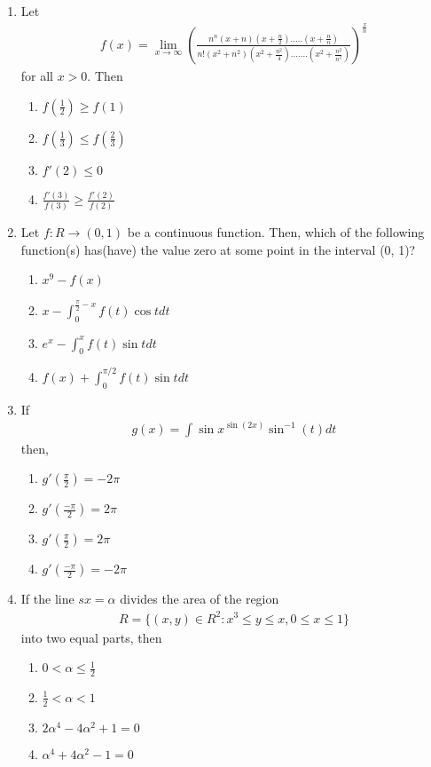 \begin{enumerate}[label=\arabic*.,ref=\thesubsection.\theenumi]
\item Let
\begin{align*}
f(x) = \lim_{x \to \infty}(\frac{n^n(x+n)(x+\frac{n}{2}).....(x+\frac{n}{n})}{n!(x^2+n^2)(x^2+\frac{n^2}{4}).......(x^2+\frac{n^2}{n^2})})^{\frac{x}{n}} 
\end{align*}
for all $x > 0$. Then
\begin{enumerate}
\item $f(\frac{1}{2}) \geq f(1)$
\item $f(\frac{1}{3}) \leq f(\frac{2}{3})$
\item $f'(2) \leq 0$
\item $\frac{f'(3)}{f(3)} \geq \frac{f'(2)}{f(2)}$
\end{enumerate}

\item Let $f: R \to (0, 1)$ be a continuous function. Then, which of the following function(s) has(have) the value zero at some point in the interval (0, 1)?
\begin{enumerate}
\item $x^9 - f(x)$
\item $x - \int_{0}^{\frac{\pi}{2} - x}f(t)\cos t dt$
\item $e^{x} - \int_{0}^{x}f(t)\sin t dt$
\item $f(x) + \int_{0}^{\pi/2}f(t)\sin t dt$
\end{enumerate}

\item If 
\begin{align*}
g(x) = \int{\sin x}^{\sin (2x)}\sin^{-1}(t)dt
\end{align*}
then,
\begin{enumerate}
\item $g'(\frac{\pi}{2}) = -2\pi$
\item $g'(\frac{-\pi}{2}) = 2\pi$
\item $g'(\frac{\pi}{2}) = 2\pi$
\item $g'(\frac{-\pi}{2}) = -2\pi$
\end{enumerate}

\item If the line $sx = \alpha$ divides the area of the region
\begin{align*}
R = \{(x, y) \in R^{2}: x^3 \leq y \leq x, 0 \leq x \leq 1\}
\end{align*}
into two equal parts, then
\begin{enumerate}
\item $0 < \alpha \leq \frac{1}{2}$
\item $\frac{1}{2} < \alpha < 1$
\item $2\alpha^{4} - 4\alpha^{2} + 1 = 0$
\item $\alpha^{4} + 4\alpha^{2} - 1 = 0$
\end{enumerate}


\end{enumerate}
